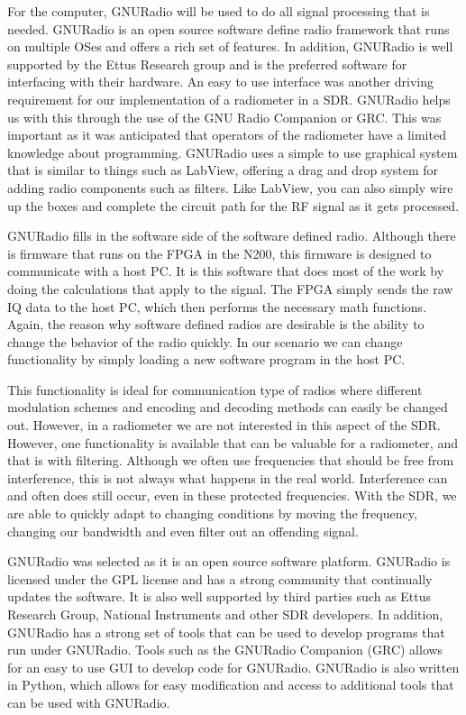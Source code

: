 For the computer, GNURadio will be used to do all signal processing that is needed.  GNURadio is an open source software define radio framework that runs on multiple OSes and offers a rich set of features.  In addition, GNURadio is well supported by the Ettus Research group and is the preferred software for interfacing with their hardware.  An easy to use interface was another driving requirement for our implementation of a radiometer in a SDR.  GNURadio helps us with this through the use of the GNU Radio Companion or GRC.  This was important as it was anticipated that operators of the radiometer have a limited knowledge about programming.  GNURadio uses a simple to use graphical system that is similar to things such as LabView, offering a drag and drop system for adding radio components such as filters.  Like LabView, you can also simply wire up the boxes and complete the circuit path for the RF signal as it gets processed.

GNURadio fills in the software side of the software defined radio.  Although there is firmware that runs on the FPGA in the N200, this firmware is designed to communicate with a host PC.  It is this software that does most of the work by doing the calculations that apply to the signal.  The FPGA simply sends the raw IQ data to the host PC, which then performs the necessary math functions.  Again, the reason why software defined radios are desirable is the ability to change the behavior of the radio quickly.  In our scenario we can change functionality by simply loading a new software program in the host PC.  

This functionality is ideal for communication type of radios where different modulation schemes and encoding and decoding methods can easily be changed out.  However, in a radiometer we are not interested in this aspect of the SDR.  However, one functionality is available that can be valuable for a radiometer, and that is with filtering.  Although we often use frequencies that should be free from interference, this is not always what happens in the real world.  Interference can and often does still occur, even in these protected frequencies.  With the SDR, we are able to quickly adapt to changing conditions by moving the frequency, changing our bandwidth and even filter out an offending signal.  

GNURadio was selected as it is an open source software platform.  GNURadio is licensed under the GPL license and has a strong community that continually updates the software.  It is also well supported by third parties such as Ettus Research Group, National Instruments and other SDR developers.  In addition, GNURadio has a strong set of tools that can be used to develop programs that run under GNURadio.  Tools such as the GNURadio Companion (GRC) allows for an easy to use GUI to develop code for GNURadio.  GNURadio is also written in Python, which allows for easy modification and access to additional tools that can be used with GNURadio.  

